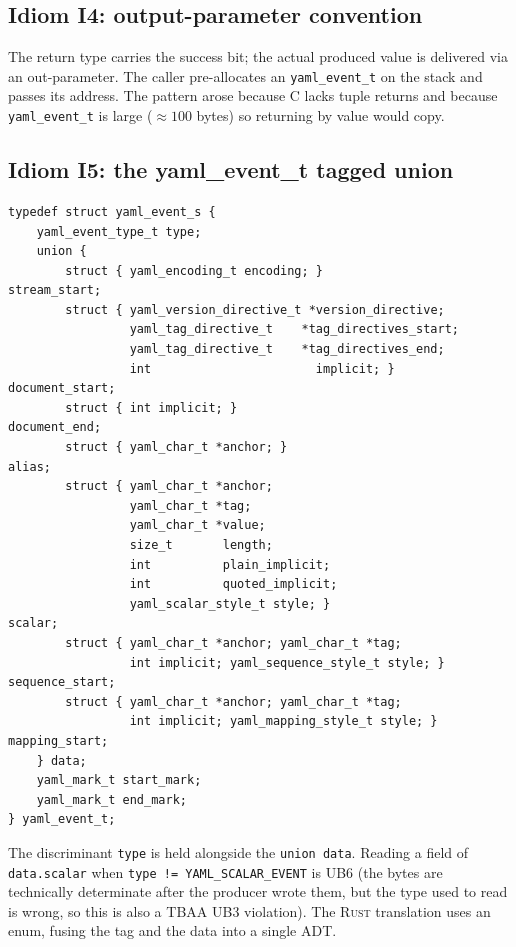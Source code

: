 \documentclass[12pt]{article}
\newcommand{\rust}{\textnormal{\textsc{Rust}}}
\theoremstyle{definition}
\theoremstyle{remark}
\begin{document}
\subsection{Idiom I4: output-parameter convention}
\label{idiom:outparam}
The return type carries the success bit; the actual produced value is delivered via an out-parameter. The caller pre-allocates an \texttt{yaml\_event\_t} on the stack and passes its address. The pattern arose because C lacks tuple returns and because \texttt{yaml\_event\_t} is large (\(\approx 100\) bytes) so returning by value would copy.

\subsection{Idiom I5: the yaml\_event\_t tagged union}
\label{idiom:tagged}
\begin{lstlisting}[style=cstyle]
typedef struct yaml_event_s {
    yaml_event_type_t type;
    union {
        struct { yaml_encoding_t encoding; }                       stream_start;
        struct { yaml_version_directive_t *version_directive;
                 yaml_tag_directive_t    *tag_directives_start;
                 yaml_tag_directive_t    *tag_directives_end;
                 int                       implicit; }             document_start;
        struct { int implicit; }                                   document_end;
        struct { yaml_char_t *anchor; }                            alias;
        struct { yaml_char_t *anchor;
                 yaml_char_t *tag;
                 yaml_char_t *value;
                 size_t       length;
                 int          plain_implicit;
                 int          quoted_implicit;
                 yaml_scalar_style_t style; }                      scalar;
        struct { yaml_char_t *anchor; yaml_char_t *tag;
                 int implicit; yaml_sequence_style_t style; }      sequence_start;
        struct { yaml_char_t *anchor; yaml_char_t *tag;
                 int implicit; yaml_mapping_style_t style; }       mapping_start;
    } data;
    yaml_mark_t start_mark;
    yaml_mark_t end_mark;
} yaml_event_t;
\end{lstlisting}
The discriminant \texttt{type} is held alongside the \texttt{union data}. Reading a field of \texttt{data.scalar} when \texttt{type != YAML\_SCALAR\_EVENT} is UB6 (the bytes are technically determinate after the producer wrote them, but the type used to read is wrong, so this is also a TBAA UB3 violation). The \rust{} translation uses an enum, fusing the tag and the data into a single ADT.
\end{document}
